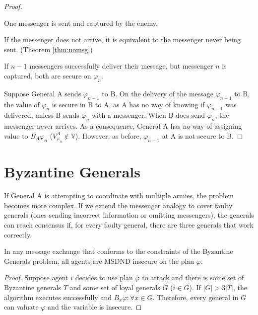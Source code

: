 \begin{proof}
\begin{case}
One messenger is sent and captured by the enemy.
\end{case}

If the messenger does not arrive, it is equivalent to the messenger never being sent. (Theorem \ref{thm:nomsg})

\begin{case}
If $n-1$ messengers successfully deliver their message, but messenger $n$ is captured, both are secure on $\varphi_{n}$.
\end{case}

Suppose General A sends $\varphi_{n-1}$ to B.
On the delivery of the message $\varphi_{n-1}$ to B, the value of $\varphi_{n}$ is secure in B to A, as A has no way of knowing if $\varphi_{n-1}$ was delivered, unless B sends $\varphi_{n}$ with a messenger.
When B does send $\varphi_{n}$, the messenger never arrives.
As a consequence, General A has no way of assigning value to $B_A \varphi_n$ ($V_{\varphi_n}^A \not \in \mathbb{V}$).
However, as before, $\varphi_{n-1}$ at A is not secure to B.
\end{proof}

\section{Byzantine Generals}

If General A is attempting to coordinate with multiple armies, the problem becomes more complex.
If we extend the messenger analogy to cover faulty generals (ones sending incorrect information or omitting messengers), the generals can reach consensus if, for every faulty general, there are three generals that work correctly.\cite{byzantine-generals}

\begin{thm}
In any message exchange that conforms to the constraints of the Byzantine Generals problem, all agents are MSDND insecure on the plan $\varphi$.
\end{thm}

\begin{proof}
Suppose agent $i$ decides to use plan $\varphi$ to attack and there is some set of Byzantine generals $T$ and some set of loyal generals $G$ ($i \in G$). If $|G| > 3|T|$, the algorithm executes successfully and $B_x \varphi : \forall x \in G$. Therefore, every general in $G$ can valuate $\varphi$ and the variable is insecure.
\end{proof}

